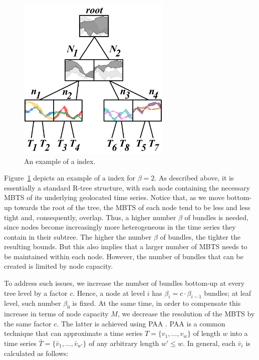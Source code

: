 \begin{figure}[!tb]
 \centering
 \includegraphics[width=0.65\textwidth]{figures/btsr_tree.png}
 \caption{An example of a \btsr index.}
 \label{fig:btsr_tree}
\end{figure}

Figure~\ref{fig:btsr_tree} depicts an example of a \btsr index for $\beta=2$. As described above, it is essentially a standard R-tree structure, with each node containing the necessary MBTS of its underlying geolocated time series. Notice that, as we move bottom-up towards the root of the tree, the MBTS of each node tend to be less and less tight and, consequently, overlap. Thus, a higher number $\beta$ of bundles is needed, since nodes become increasingly more heterogeneous in the time series they contain in their subtree. The higher the number $\beta$ of bundles, the tighter the resulting bounds. But this also implies that a larger number of MBTS needs to be maintained within each node. However, the number of bundles that can be created is limited by node capacity.

To address such issues, we increase the number of bundles bottom-up at every tree level by a factor $c$. Hence, a node at level $i$ has $\beta_{i} = c \cdot \beta_{i-1}$ bundles; at leaf level, such number $\beta_0$ is fixed. At the same time, in order to compensate this increase in terms of node capacity $M$, we decrease the resolution of the MBTS by the same factor $c$. The latter is achieved using PAA \cite{keogh2001paa,faloutsos2000vldb}. PAA is a common technique that can approximate a time series $T = \{v_1, \ldots, v_w\}$ of length $w$ into a time series $\bar{T} = \{\bar{v}_1, \ldots, \bar{v}_{w'}\}$ of any arbitrary length $w' \leq w$. In general, each $\bar{v}_i$ is calculated as follows:

